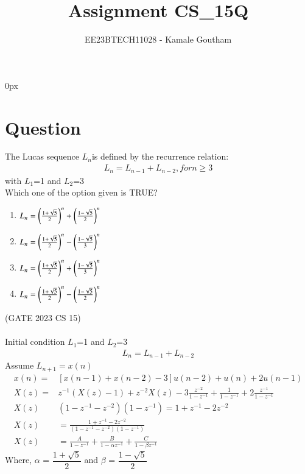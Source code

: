 \documentclass[journal,12pt,twocolumn]{IEEEtran}
\theoremstyle{remark}
\begin{document}
\parindent 0px

\title{Assignment CS\_15Q}
\author{EE23BTECH11028 - Kamale Goutham$^{}$%
}
\maketitle
\newpage
\bigskip
\section*{Question}
The Lucas sequence $L_{n}$is defined by the recurrence relation:\\
\begin{align*}
    L_{n}=L_{n-1}+L_{n-2}, for n\geq3
\end{align*}
with $L_{1}$=1 and $L_{2}$=3\\
Which one of the option given is TRUE?\\
\begin{enumerate}
    \item $L_{n}=\left(\frac{1+\sqrt{5}}{2}\right)^n+\left(\frac{1-\sqrt{5}}{2}\right)^n$
    \item $L_{n}=\left(\frac{1+\sqrt{5}}{2}\right)^n-\left(\frac{1-\sqrt{5}}{3}\right)^n$
    \item $L_{n}=\left(\frac{1+\sqrt{5}}{2}\right)^n+\left(\frac{1-\sqrt{5}}{3}\right)^n$
    \item $L_{n}=\left(\frac{1+\sqrt{5}}{2}\right)^n-\left(\frac{1-\sqrt{5}}{2}\right)^n$
\end{enumerate}
\hfill{(GATE 2023 CS 15)}\\
\solution\\
Initial condition $L_{1}$=1 and $L_{2}$=3
\begin{align}
 L_{n}=L_{n-1}+L_{n-2}
\end{align}
Assume $L_{n+1}=x(n)$\\
\begin{align}
 x(n)=&[x(n-1)+x(n-2)-3]u(n-2)+u(n)+2u(n-1)\\
 X(z)=&z^{-1}(X(z)-1)+z^{-2}X(z)-3\frac{z^{-2}}{1-z^{-1}}+\frac{1}{1-z^{-1}}+2\frac{z^{-1}}{1-z^{-1}}\\
 X(z)&(1-z^{-1}-z^{-2})(1-z^{-1})=1+z^{-1}-2z^{-2}\\
 X(z)&=\frac{1+z^{-1}-2z^{-2}}{(1-z^{-1}-z^{-2})(1-z^{-1})}\\
 X(z)&=\frac{A}{1-z^{-1}}+\frac{B}{1-\alpha z^{-1}}+\frac{C}{1-\beta z^{-1}}
 \end{align}
 Where, $\alpha$ = $\dfrac{1 +\sqrt{5}}{2}$ and $\beta$ = $\dfrac{1 -\sqrt{5}}{2}$ \\
 
\end{document}
